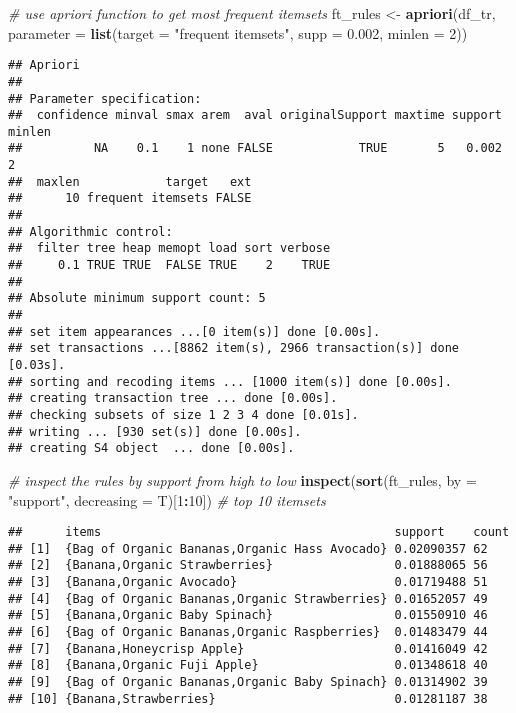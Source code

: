 \documentclass[]{article}
\newenvironment{Shaded}{\begin{snugshade}}{\end{snugshade}}
\newcommand{\CommentTok}[1]{\textcolor[rgb]{0.56,0.35,0.01}{\textit{#1}}}
\newcommand{\DataTypeTok}[1]{\textcolor[rgb]{0.13,0.29,0.53}{#1}}
\newcommand{\DecValTok}[1]{\textcolor[rgb]{0.00,0.00,0.81}{#1}}
\newcommand{\FloatTok}[1]{\textcolor[rgb]{0.00,0.00,0.81}{#1}}
\newcommand{\KeywordTok}[1]{\textcolor[rgb]{0.13,0.29,0.53}{\textbf{#1}}}
\newcommand{\NormalTok}[1]{#1}
\newcommand{\OperatorTok}[1]{\textcolor[rgb]{0.81,0.36,0.00}{\textbf{#1}}}
\newcommand{\StringTok}[1]{\textcolor[rgb]{0.31,0.60,0.02}{#1}}
\begin{document}
\begin{Shaded}
\begin{Highlighting}[]
\CommentTok{# use apriori function to get most frequent itemsets}
\NormalTok{ft_rules <-}\StringTok{ }\KeywordTok{apriori}\NormalTok{(df_tr, }\DataTypeTok{parameter =} \KeywordTok{list}\NormalTok{(}\DataTypeTok{target =} \StringTok{"frequent itemsets"}\NormalTok{, }\DataTypeTok{supp =} \FloatTok{0.002}\NormalTok{, }\DataTypeTok{minlen =} \DecValTok{2}\NormalTok{))}
\end{Highlighting}
\end{Shaded}

\begin{verbatim}
## Apriori
## 
## Parameter specification:
##  confidence minval smax arem  aval originalSupport maxtime support minlen
##          NA    0.1    1 none FALSE            TRUE       5   0.002      2
##  maxlen            target   ext
##      10 frequent itemsets FALSE
## 
## Algorithmic control:
##  filter tree heap memopt load sort verbose
##     0.1 TRUE TRUE  FALSE TRUE    2    TRUE
## 
## Absolute minimum support count: 5 
## 
## set item appearances ...[0 item(s)] done [0.00s].
## set transactions ...[8862 item(s), 2966 transaction(s)] done [0.03s].
## sorting and recoding items ... [1000 item(s)] done [0.00s].
## creating transaction tree ... done [0.00s].
## checking subsets of size 1 2 3 4 done [0.01s].
## writing ... [930 set(s)] done [0.00s].
## creating S4 object  ... done [0.00s].
\end{verbatim}

\begin{Shaded}
\begin{Highlighting}[]
\CommentTok{# inspect the rules by support from high to low}
\KeywordTok{inspect}\NormalTok{(}\KeywordTok{sort}\NormalTok{(ft_rules, }\DataTypeTok{by =} \StringTok{"support"}\NormalTok{, }\DataTypeTok{decreasing =}\NormalTok{ T)[}\DecValTok{1}\OperatorTok{:}\DecValTok{10}\NormalTok{]) }\CommentTok{# top 10 itemsets}
\end{Highlighting}
\end{Shaded}

\begin{verbatim}
##      items                                         support    count
## [1]  {Bag of Organic Bananas,Organic Hass Avocado} 0.02090357 62   
## [2]  {Banana,Organic Strawberries}                 0.01888065 56   
## [3]  {Banana,Organic Avocado}                      0.01719488 51   
## [4]  {Bag of Organic Bananas,Organic Strawberries} 0.01652057 49   
## [5]  {Banana,Organic Baby Spinach}                 0.01550910 46   
## [6]  {Bag of Organic Bananas,Organic Raspberries}  0.01483479 44   
## [7]  {Banana,Honeycrisp Apple}                     0.01416049 42   
## [8]  {Banana,Organic Fuji Apple}                   0.01348618 40   
## [9]  {Bag of Organic Bananas,Organic Baby Spinach} 0.01314902 39   
## [10] {Banana,Strawberries}                         0.01281187 38
\end{verbatim}
\end{document}
